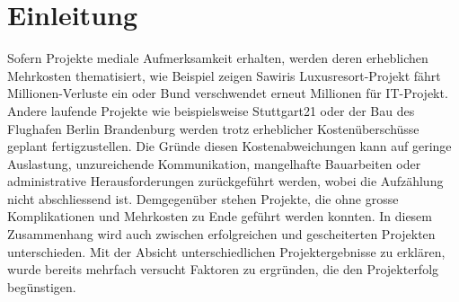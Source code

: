 \chapter{Einleitung}
Sofern Projekte mediale Aufmerksamkeit erhalten, werden deren erheblichen Mehrkosten thematisiert, wie Beispiel zeigen \glqq Sawiris Luxusresort-Projekt fährt Millionen-Verluste ein\grqq{ } oder \glqq Bund verschwendet erneut Millionen für IT-Projekt\grqq{ }\citep{nzz16,fuchs15}. Andere laufende Projekte wie beispielsweise Stuttgart21 oder der Bau des Flughafen Berlin Brandenburg werden trotz erheblicher Kostenüberschüsse geplant fertigzustellen. Die Gründe diesen Kostenabweichungen kann auf geringe Auslastung, unzureichende Kommunikation, mangelhafte Bauarbeiten oder administrative Herausforderungen zurückgeführt werden, wobei die Aufzählung nicht abschliessend ist. Demgegenüber stehen Projekte, die ohne grosse Komplikationen und Mehrkosten zu Ende geführt werden konnten. In diesem Zusammenhang wird auch zwischen erfolgreichen und gescheiterten Projekten unterschieden. Mit der Absicht unterschiedlichen Projektergebnisse zu erklären, wurde bereits mehrfach versucht Faktoren zu ergründen, die den Projekterfolg begünstigen.
\newline\newline
